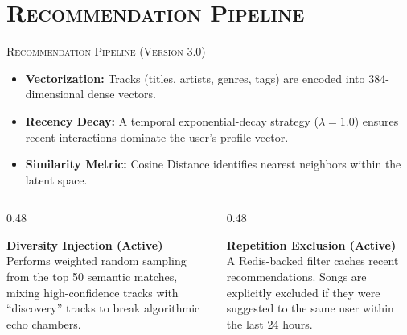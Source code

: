 \documentclass[xcolor=dvipsnames, aspectratio=1610]{beamer}
\begin{document}
\section{\textsc{Recommendation Pipeline}}
\begin{frame}{\textsc{Recommendation Pipeline (Version 3.0)}}

  \begin{itemize}
    \item \textbf{Vectorization:} Tracks (titles, artists, genres, tags) are encoded into 384-dimensional dense vectors.
    \item \textbf{Recency Decay:} A temporal exponential-decay strategy ($\lambda=1.0$) ensures recent interactions dominate the user's profile vector.
    \item \textbf{Similarity Metric:} Cosine Distance identifies nearest neighbors within the latent space.
  \end{itemize}

  \vspace{2.5mm}
  \begin{columns}[T]
    \begin{column}{0.48\linewidth}
      \begin{ProposalBox}
        \textbf{Diversity Injection (Active)} \\
        Performs weighted random sampling from the top 50 semantic matches, mixing high-confidence tracks with ``discovery'' tracks to break algorithmic echo chambers.
      \end{ProposalBox}
    \end{column}
    \begin{column}{0.48\linewidth}
      \begin{CommentBox}
        \textbf{Repetition Exclusion (Active)} \\
        A Redis-backed filter caches recent recommendations. Songs are explicitly excluded if they were suggested to the same user within the last 24 hours.
      \end{CommentBox}
    \end{column}
  \end{columns}

\end{frame}

\end{document}

